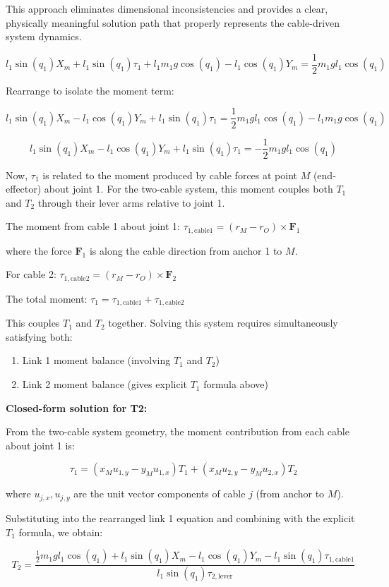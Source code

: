 This approach eliminates dimensional inconsistencies and provides a clear, physically meaningful solution path that properly represents the cable-driven system dynamics.

$$l_1 \sin(q_1) X_m + l_1 \sin(q_1) \tau_1 + l_1 m_1 g \cos(q_1) - l_1 \cos(q_1) Y_m = \frac{1}{2} m_1 g l_1 \cos(q_1)$$

Rearrange to isolate the moment term:

$$l_1 \sin(q_1) X_m - l_1 \cos(q_1) Y_m + l_1 \sin(q_1) \tau_1 = \frac{1}{2} m_1 g l_1 \cos(q_1) - l_1 m_1 g \cos(q_1)$$

$$l_1 \sin(q_1) X_m - l_1 \cos(q_1) Y_m + l_1 \sin(q_1) \tau_1 = -\frac{1}{2} m_1 g l_1 \cos(q_1)$$

Now, $\tau_1$ is related to the moment produced by cable forces at point $M$ (end-effector) about joint 1. For the two-cable system, this moment couples both $T_1$ and $T_2$ through their lever arms relative to joint 1.

The moment from cable 1 about joint 1: $\tau_{1,\text{cable1}} = (r_M - r_O) \times \mathbf{F}_1$

where the force $\mathbf{F}_1$ is along the cable direction from anchor 1 to $M$.

For cable 2: $\tau_{1,\text{cable2}} = (r_M - r_O) \times \mathbf{F}_2$

The total moment: $\tau_1 = \tau_{1,\text{cable1}} + \tau_{1,\text{cable2}}$

This couples $T_1$ and $T_2$ together. Solving this system requires simultaneously satisfying both:
\begin{enumerate}
    \item Link 1 moment balance (involving $T_1$ and $T_2$)
    \item Link 2 moment balance (gives explicit $T_1$ formula above)
\end{enumerate}

\textbf{Closed-form solution for T2:}

From the two-cable system geometry, the moment contribution from each cable about joint 1 is:

$$\tau_1 = (x_M u_{1,y} - y_M u_{1,x}) T_1 + (x_M u_{2,y} - y_M u_{2,x}) T_2$$

where $u_{j,x}, u_{j,y}$ are the unit vector components of cable $j$ (from anchor to $M$).

Substituting into the rearranged link 1 equation and combining with the explicit $T_1$ formula, we obtain:

\begin{equation}
\boxed{T_2 = \frac{\frac{1}{2} m_1 g l_1 \cos(q_1) + l_1 \sin(q_1) X_m - l_1 \cos(q_1) Y_m - l_1 \sin(q_1) \tau_{1,\text{cable1}}}{l_1 \sin(q_1) \tau_{2,\text{lever}}}}
\label{eq:T2_closed_form}
\end{equation}

